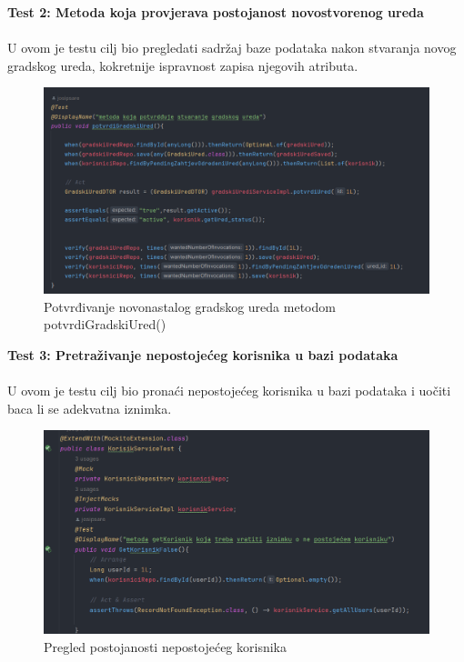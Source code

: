 			
			 \textbf{Test 2: Metoda koja provjerava postojanost novostvorenog ureda}\\
			\\ U ovom je testu cilj bio pregledati sadržaj baze podataka nakon stvaranja novog gradskog ureda, kokretnije ispravnost zapisa njegovih atributa.
			
			\begin{figure}[H]
			\includegraphics[scale=0.4]{slike/potvrdiUred.PNG} %
			\centering
			\caption{Potvrđivanje novonastalog gradskog ureda metodom potvrdiGradskiUred()}
			\label{fig:implementacija}
		\end{figure}
		
		
		\textbf{Test 3: Pretraživanje nepostojećeg korisnika u bazi podataka}\\
			\\ U ovom je testu cilj bio pronaći nepostojećeg korisnika u bazi podataka i uočiti baca li se adekvatna iznimka.
			
			\begin{figure}[H]
			\includegraphics[scale=0.6]{slike/nepostojeciUser.PNG} %
			\centering
			\caption{Pregled postojanosti nepostojećeg korisnika}
			\label{fig:implementacija}
		\end{figure}
		
